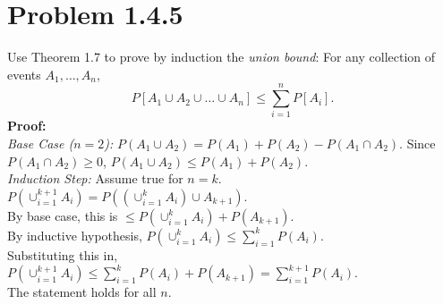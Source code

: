 \documentclass{article}
\begin{document}
\newpage

\section*{Problem 1.4.5}
Use Theorem 1.7 to prove by induction the \textit{union bound}: For any collection of events $A_1, \dots, A_n$,
\[ P[A_1 \cup A_2 \cup \dots \cup A_n] \le \sum_{i=1}^n P[A_i]. \]
\textbf{Proof:} \\
\textit{Base Case ($n=2$):} $P(A_1 \cup A_2) = P(A_1) + P(A_2) - P(A_1 \cap A_2)$. Since $P(A_1 \cap A_2) \ge 0$, $P(A_1 \cup A_2) \le P(A_1) + P(A_2)$. \\
\textit{Induction Step:} Assume true for $n=k$. \\
$P(\cup_{i=1}^{k+1} A_i) = P( (\cup_{i=1}^k A_i) \cup A_{k+1} )$. \\
By base case, this is $\le P(\cup_{i=1}^k A_i) + P(A_{k+1})$. \\
By inductive hypothesis, $P(\cup_{i=1}^k A_i) \le \sum_{i=1}^k P(A_i)$. \\
Substituting this in, $P(\cup_{i=1}^{k+1} A_i) \le \sum_{i=1}^k P(A_i) + P(A_{k+1}) = \sum_{i=1}^{k+1} P(A_i)$. \\
The statement holds for all $n$.
\end{document}
